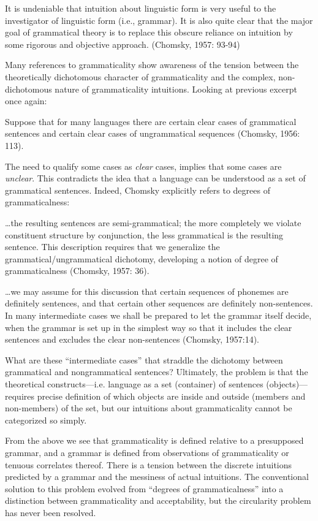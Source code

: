 It is undeniable that intuition about linguistic form is very useful to the investigator of linguistic form (i.e., grammar). It is also quite clear that the major goal of grammatical theory is to replace this obscure reliance on intuition by some rigorous and objective approach. (Chomsky, 1957: 93-94)

  Many references to grammaticality show awareness of the tension between the theoretically dichotomous character of grammaticality and the complex, non-dichotomous nature of grammaticality intuitions. Looking at previous excerpt once again:

Suppose that for many languages there are certain clear cases of grammatical sentences and certain clear cases of ungrammatical sequences (Chomsky, 1956: 113).

The need to qualify some cases as \textit{clear} cases, implies that some cases are \textit{unclear}. This contradicts the idea that a language can be understood as a set of grammatical sentences. Indeed, Chomsky explicitly refers to degrees of grammaticalness: 

…the resulting sentences are semi-grammatical; the more completely we violate constituent structure by conjunction, the less grammatical is the resulting sentence. This description requires that we generalize the grammatical/ungrammatical dichotomy, developing a notion of degree of grammaticalness (Chomsky, 1957: 36).

…we may assume for this discussion that certain sequences of phonemes are definitely sentences, and that certain other sequences are definitely non-sentences. In many intermediate cases we shall be prepared to let the grammar itself decide, when the grammar is set up in the simplest way so that it includes the clear sentences and excludes the clear non-sentences (Chomsky, 1957:14).

  What are these “intermediate cases” that straddle the dichotomy between grammatical and nongrammatical sentences? Ultimately, the problem is that the theoretical constructs—i.e. language as a set (container) of sentences (objects)—requires precise definition of which objects are inside and outside (members and non-members) of the set, but our intuitions about grammaticality cannot be categorized so simply.

  From the above we see that grammaticality is defined relative to a presupposed grammar, and a grammar is defined from observations of grammaticality or tenuous correlates thereof. There is a tension between the discrete intuitions predicted by a grammar and the messiness of actual intuitions. The conventional solution to this problem evolved from “degrees of grammaticalness” into a distinction between grammaticality and acceptability, but the circularity problem has never been resolved. 

